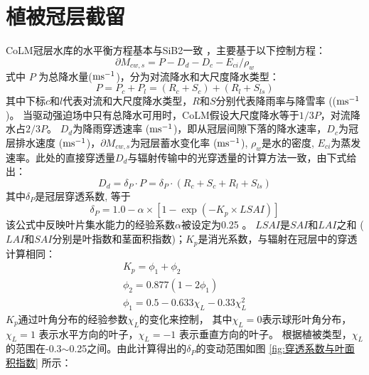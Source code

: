 \section{植被冠层截留}\label{植被冠层截留}
CoLM冠层水库的水平衡方程基本与SiB2一致 \citet{sellers1996revised}，主要基于以下控制方程：
\begin{equation}
\partial M_{c w, s}=P-D_{d}-D_{c}-E_{c i} / \rho_{w}
\end{equation}
式中 $P$ 为总降水量($\rm m s^{-1}$)，分为对流降水和大尺度降水类型：
\begin{equation}
P=P_{c}+P_{l}=\left(R_{c}+S_{c}\right)+\left(R_{l}+S_{l s}\right)
\end{equation}
其中下标$c$和$l$代表对流和大尺度降水类型，$R$和$S$分别代表降雨率与降雪率 (($\rm m s^{-1}$)。
当驱动强迫场中只有总降水可用时，CoLM假设大尺度降水等于$1/3P$，对流降水占$2/3P$。
$D_d$为降雨穿透速率 ($\rm m s^{-1}$)，即从冠层间隙下落的降水速率，$D_c$为冠层排水速度 ($\rm m s^{-1}$)，$\partial M_{cw,s}$为冠层蓄水变化率 ($\rm m s^{-1}$), 
$\rho_w$是水的密度, $E_{ci}$为蒸发速率。此处的直接穿透量$D_d$与辐射传输中的光穿透量的计算方法一致，由下式给出：
\begin{equation}
D_{d}=\delta_{P} \cdot P=\delta_{P} \cdot\left(R_{c}+S_{c}+R_{l}+S_{l s}\right)
\end{equation}
其中$\delta_P$是冠层穿透系数, 等于
\begin{equation}
\delta_{P}=1.0-\alpha \times\left[1-\exp \left(-K_{p} \times LSAI\right)\right]
\end{equation}
该公式中反映叶片集水能力的经验系数$\alpha$被设定为0.25 \citep{lawrence2011parameterization}。
$LSAI$是$SAI$和$LAI$之和 ($LAI$和$SAI$分别是叶指数和茎面积指数)；$K_p$是消光系数，与辐射在冠层中的穿透计算相同：
\begin{equation}
\begin{array}{c}K_{p}=\phi_{1}+\phi_{2} \\ \phi_{2}=0.877\left(1-2 \phi_{1}\right) \\ \phi_{1}=0.5-0.633 \chi_{L}-0.33 \chi_{L}^{2}\end{array}
\end{equation}
$K_p$通过叶角分布的经验参数$\chi_L$的变化来控制，
其中$\chi_L=0$表示球形叶角分布，$\chi_L= 1$ 表示水平方向的叶子，$\chi_L= -1$ 表示垂直方向的叶子。
根据植被类型，$\chi_L$的范围在-0.3$\sim$0.25之间。由此计算得出的$\delta_P$的变动范围如图 \ref{fig:穿透系数与叶面积指数} 所示：
